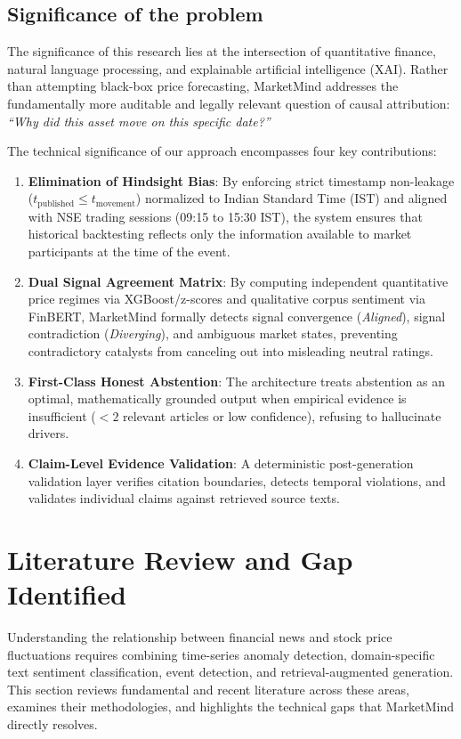 \documentclass{article}
\begin{document}
    \subsection{Significance of the problem}
	
	The significance of this research lies at the intersection of quantitative finance, natural language processing, and explainable artificial intelligence (XAI). Rather than attempting black-box price forecasting, MarketMind addresses the fundamentally more auditable and legally relevant question of causal attribution: \textit{``Why did this asset move on this specific date?''}

	The technical significance of our approach encompasses four key contributions:
	\begin{enumerate}
		\item \textbf{Elimination of Hindsight Bias}: By enforcing strict timestamp non-leakage ($t_{\text{published}} \le t_{\text{movement}}$) normalized to Indian Standard Time (IST) and aligned with NSE trading sessions (09:15 to 15:30 IST), the system ensures that historical backtesting reflects only the information available to market participants at the time of the event.
		\item \textbf{Dual Signal Agreement Matrix}: By computing independent quantitative price regimes via XGBoost/z-scores and qualitative corpus sentiment via FinBERT, MarketMind formally detects signal convergence (\textit{Aligned}), signal contradiction (\textit{Diverging}), and ambiguous market states, preventing contradictory catalysts from canceling out into misleading neutral ratings.
		\item \textbf{First-Class Honest Abstention}: The architecture treats abstention as an optimal, mathematically grounded output when empirical evidence is insufficient ($< 2$ relevant articles or low confidence), refusing to hallucinate drivers.
		\item \textbf{Claim-Level Evidence Validation}: A deterministic post-generation validation layer verifies citation boundaries, detects temporal violations, and validates individual claims against retrieved source texts.
	\end{enumerate}

	\pagebreak
    
	\section{Literature Review and Gap Identified}
    \noindent
	Understanding the relationship between financial news and stock price fluctuations requires combining time-series anomaly detection, domain-specific text sentiment classification, event detection, and retrieval-augmented generation. This section reviews fundamental and recent literature across these areas, examines their methodologies, and highlights the technical gaps that MarketMind directly resolves.
\end{document}
